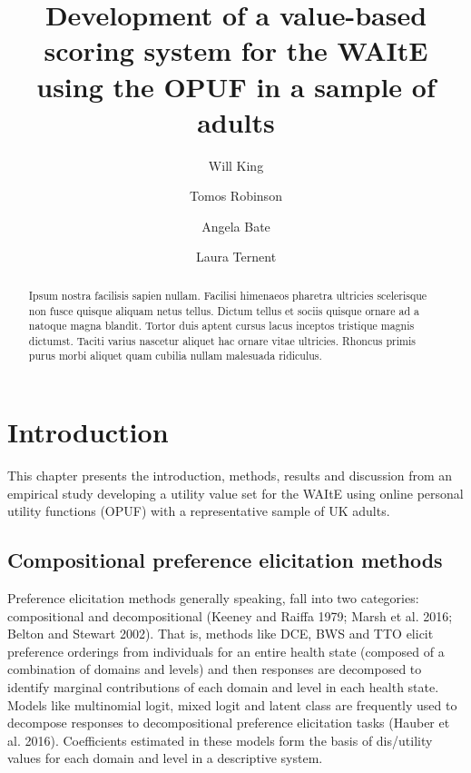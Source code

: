 \documentclass[
  letterpaper,
  DIV=11,
  numbers=noendperiod]{scrartcl}
\title{Development of a value-based scoring system for the WAItE using
the OPUF in a sample of adults}
\author{Will King \and Tomos Robinson \and Angela Bate \and Laura
Ternent}
\date{}
\begin{document}
\maketitle
\begin{abstract}
Ipsum nostra facilisis sapien nullam. Facilisi himenaeos pharetra
ultricies scelerisque non fusce quisque aliquam netus tellus. Dictum
tellus et sociis quisque ornare ad a natoque magna blandit. Tortor duis
aptent cursus lacus inceptos tristique magnis dictumst. Taciti varius
nascetur aliquet hac ornare vitae ultricies. Rhoncus primis purus morbi
aliquet quam cubilia nullam malesuada ridiculus.
\end{abstract}


\section{Introduction}\label{sec-introduction}

This chapter presents the introduction, methods, results and discussion
from an empirical study developing a utility value set for the WAItE
using online personal utility functions (OPUF) with a representative
sample of UK adults.

\subsection{Compositional preference elicitation
methods}\label{compositional-preference-elicitation-methods}

Preference elicitation methods generally speaking, fall into two
categories: compositional and decompositional (Keeney and Raiffa 1979;
Marsh et al. 2016; Belton and Stewart 2002). That is, methods like DCE,
BWS and TTO elicit preference orderings from individuals for an entire
health state (composed of a combination of domains and levels) and then
responses are decomposed to identify marginal contributions of each
domain and level in each health state. Models like multinomial logit,
mixed logit and latent class are frequently used to decompose responses
to decompositional preference elicitation tasks (Hauber et al. 2016).
Coefficients estimated in these models form the basis of dis/utility
values for each domain and level in a descriptive system.
\end{document}
